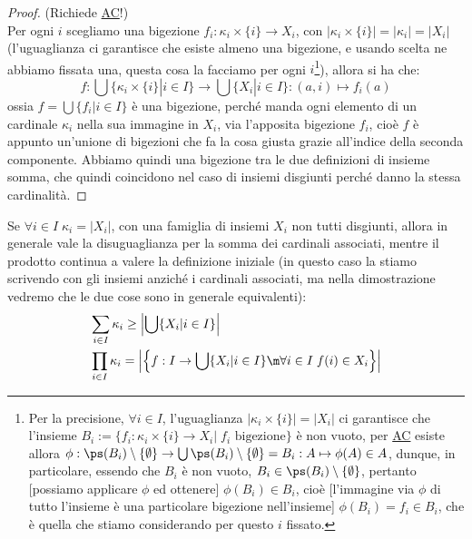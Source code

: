 \documentclass[11pt]{scrartcl}
\begin{document}
\begin{proof}
	(Richiede \hyperref[ax9]{AC}!)\\
	Per ogni $i$ scegliamo una bigezione
    $f_i : \kappa_i \times \{i\} \rightarrow X_i$, con $|\kappa_i \times \{i\}| = |\kappa_i| = |X_i|$ (l'uguaglianza ci garantisce che esiste almeno una bigezione, e usando scelta ne abbiamo fissata una, questa cosa la facciamo per ogni $i$\footnote{Per la precisione, $\forall i \in I$, l'uguaglianza $|\kappa_i \times \{i\}| = |X_i|$ 
	ci garantisce che l'insieme $B_i := \{f_i : \kappa_i \times \{i\} \rightarrow X_i | \; \text{$f_i$ bigezione}\}$ è non vuoto, per \hyperref[ax9]{AC} esiste allora $\phi : \ps(B_i)\setminus\{\emptyset\} \rightarrow \bigcup \ps(B_i)\setminus\{\emptyset\} = B_i : A \mapsto \phi(A) \in A$, dunque, in particolare, essendo che $B_i$ è non vuoto, 
	$B_i \in \ps(B_i)\setminus\{\emptyset\}$, pertanto [possiamo applicare $\phi$ ed ottenere] $\phi(B_i) \in B_i$, cioè [l'immagine via $\phi$ di tutto l'insieme è una particolare bigezione nell'insieme] $\phi(B_i) = f_i \in B_i$, che è quella che stiamo considerando per questo $i$ fissato.}), allora si ha che:
	\[ f : \bigcup \{\kappa_i \times\{i\} | i \in I\} \rightarrow \bigcup \{X_i | i \in I\} : (a,i) \mapsto f_i(a)
		\]
	ossia $f = \bigcup\{f_i | i \in I\}$ è una bigezione, perché manda ogni elemento di un cardinale $\kappa_i$ nella sua immagine in $X_i$, via l'apposita bigezione $f_i$, cioè $f$ è appunto un'unione di bigezioni che fa la cosa giusta grazie all'indice della seconda componente. Abbiamo quindi una bigezione tra le due definizioni di insieme somma, che quindi coincidono nel caso di insiemi disgiunti perché danno la stessa cardinalità.
\end{proof}

\begin{note}
	Se $\forall i \in I \; \kappa_i = |X_i|$, con una famiglia di insiemi $X_i$ non tutti disgiunti, allora in generale vale la disuguaglianza per la somma dei cardinali associati, mentre il prodotto continua a valere la definizione iniziale (in questo caso la stiamo scrivendo con gli insiemi anziché i cardinali associati, ma nella dimostrazione vedremo che le due cose sono in generale equivalenti):
	\[ \begin{split}
		&\sum_{i \in I} \kappa_i \geq \left\lvert\bigcup\{X_i | i \in I\} \right\rvert  \\
		&\prod_{i \in I} \kappa_i = \left\lvert \left\{f : I \rightarrow \bigcup \{X_i | i \in I\} \m \forall i \in I \; f(i) \in X_i\right\}\right\rvert 
	\end{split}
		\]
\end{note}
\end{document}
